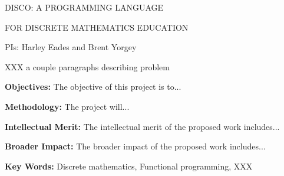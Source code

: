 \centerline{\Large DISCO: A PROGRAMMING LANGUAGE}
\vspace{1ex}
\centerline{\Large FOR DISCRETE MATHEMATICS EDUCATION}
\vspace{3ex}
\centerline{\large PIs: Harley Eades and Brent Yorgey}
\vspace{3ex}

\begin{comment}
  The proposal must contain a summary of the proposed activity suitable
  for publication, not more than one page in length. It should not be an
  abstract of the proposal, but rather a self-contained description of the
  activity that would result if the proposal were funded. The summary
  should be written in the third person and include a statement of
  objectives and methods to be employed. It must clearly address in
  separate statements (within the one-page summary): (1) the intellectual
  merit of the proposed activity; and (2) the broader impacts resulting
  from the proposed activity. (See Chapter III for further descriptive
  information on the NSF merit review criteria.) It should be informative
  to other persons working in the same or related fields and, insofar as
  possible, understandable to a scientifically or technically literate lay
  reader. Proposals that do not separately address both merit review
  criteria within the one page Project Summary will be returned without
  review.
\end{comment}

XXX a couple paragraphs describing problem

{\bf Objectives: } The objective of this project is to...

{\bf Methodology: } The project will...

{\bf Intellectual Merit:} The intellectual merit of the proposed work
includes...

{\bf Broader Impact: } The broader impact of the proposed work
includes...

{\bf Key Words:} Discrete mathematics, Functional programming, XXX



